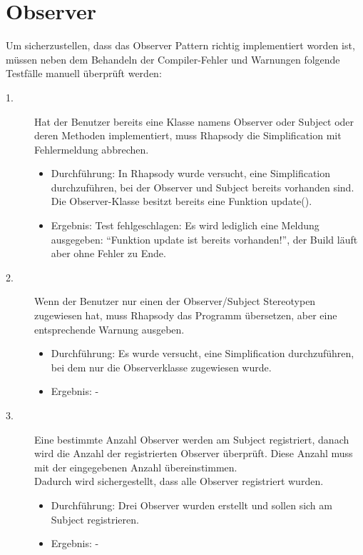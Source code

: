 \section{Observer}

Um sicherzustellen, dass das Observer Pattern richtig implementiert worden ist, müssen neben dem Behandeln der Compiler-Fehler und Warnungen folgende Testfälle manuell überprüft werden: 

\begin{description}

	\item[1.]
	Hat der Benutzer bereits eine Klasse namens Observer oder Subject oder deren Methoden implementiert, muss Rhapsody die Simplification mit Fehlermeldung abbrechen.
	\begin{itemize}
	  	\item{Durchführung:}
	  		In Rhapsody wurde versucht, eine Simplification durchzuführen, bei der
	  		Observer und Subject bereits vorhanden sind. Die Observer-Klasse besitzt
	  		bereits eine Funktion update().
	  	\item{Ergebnis:}
	  		Test fehlgeschlagen:
	  		Es wird lediglich eine Meldung ausgegeben: "`Funktion update ist
	  		bereits vorhanden!"', der Build läuft aber ohne Fehler zu Ende.
	\end{itemize}
	
	\item[2.]
	Wenn der Benutzer nur einen der Observer/Subject Stereotypen zugewiesen hat, muss Rhapsody das Programm übersetzen, aber eine entsprechende Warnung ausgeben.
	\begin{itemize}
  		\item{Durchführung:}
			Es wurde versucht, eine Simplification durchzuführen, bei dem nur die
			Observerklasse zugewiesen wurde.
  		\item{Ergebnis:}
			-
  	\end{itemize}
	
	\item[3.]
	Eine bestimmte Anzahl Observer werden am Subject registriert, danach wird die Anzahl der registrierten Observer überprüft. Diese Anzahl muss mit der eingegebenen Anzahl übereinstimmen. \\
	Dadurch wird sichergestellt, dass alle Observer registriert wurden.
	\begin{itemize}
  		\item{Durchführung:}
			Drei Observer wurden erstellt und sollen sich am Subject registrieren.
  		\item{Ergebnis:}
			-
  	\end{itemize}


\end{description}
